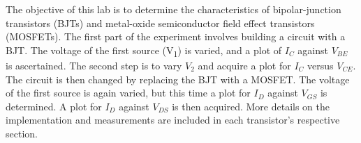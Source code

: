 The objective of this lab is to determine the characteristics of bipolar-junction transistors (BJTs) and metal-oxide semiconductor field effect transistors (MOSFETs). The first part of the experiment involves building a circuit with a BJT. The voltage of the first source (V\textsubscript{1}) is varied, and a plot of $I_C$ against $V_{BE}$ is ascertained. The second step is to vary $V_2$ and acquire a plot for $I_C$ versus $V_{CE}$. The circuit is then changed by replacing the BJT with a MOSFET. The voltage of the first source is again varied, but this time a plot for $I_D$ against $V_{GS}$ is determined. A plot for $I_D$ against $V_{DS}$ is then acquired. More details on the implementation and measurements are included in each transistor's respective section. \\
